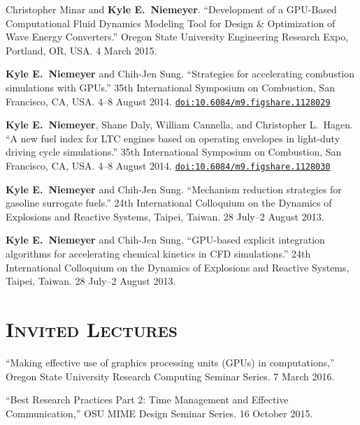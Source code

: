 \documentclass[margin,line,11pt]{res}
\makeatletter
\newlength{\bibhang}
\newlength{\bibsep}
 {\@listi \global\bibsep\itemsep \global\advance\bibsep by\parsep}
\newenvironment{bibenum*}
  {\renewcommand\labelenumi{\theenumi.}%
   \etaremune[
     topsep=0pt,
     itemsep=\bibsep,
     parsep=0pt,partopsep=0pt,
     itemindent=-\bibhang,
     leftmargin={\bibhang+\widthof{[999]}}]}
  {\endetaremune}
\newcommand*{\doi}[1]{\href{http://dx.doi.org/#1}{\nolinkurl{doi:#1}}}
\makeatother
\begin{document}
\begin{resume}
\begin{bibenum*}
\item Christopher Minar and \textbf{Kyle E.\ Niemeyer}. ``Development of a GPU-Based Computational Fluid Dynamics Modeling Tool for Design \& Optimization of Wave Energy Converters.'' Oregon State University Engineering Research Expo, Portland, OR, USA. 4 March 2015.

\item \textbf{Kyle E.\ Niemeyer} and Chih-Jen Sung. ``Strategies for accelerating combustion simulations with GPUs.'' 35th International Symposium on Combustion, San Francisco, CA, USA. 4--8 August 2014. \doi{10.6084/m9.figshare.1128029}

\item \textbf{Kyle E.\ Niemeyer}, Shane Daly, William Cannella, and Christopher L.\ Hagen. ``A new fuel index for LTC engines based on operating envelopes in light-duty driving cycle simulations.'' 35th International Symposium on Combustion, San Francisco, CA, USA. 4--8 August 2014. \doi{10.6084/m9.figshare.1128030}

\item \textbf{Kyle E.\ Niemeyer} and Chih-Jen Sung. ``Mechanism reduction strategies for gasoline surrogate fuels.'' 24th International Colloquium on the Dynamics of Explosions and Reactive Systems, Taipei, Taiwan. 28 July--2 August 2013.

\item \textbf{Kyle E.\ Niemeyer} and Chih-Jen Sung. ``GPU-based explicit integration algorithms for accelerating chemical kinetics in CFD simulations.'' 24th International Colloquium on the Dynamics of Explosions and Reactive Systems, Taipei, Taiwan. 28 July--2 August 2013.

\end{bibenum*}

\section{\textsc{Invited Lectures}}

\begin{bibenum*}
\item ``Making effective use of graphics processing units (GPUs) in computations,'' Oregon State University Research Computing Seminar Series. 7 March 2016.

\item ``Best Research Practices Part 2: Time Management and Effective Communication,'' OSU MIME Design Seminar Series. 16 October 2015.


\end{bibenum*}
\end{resume}
\end{document}
